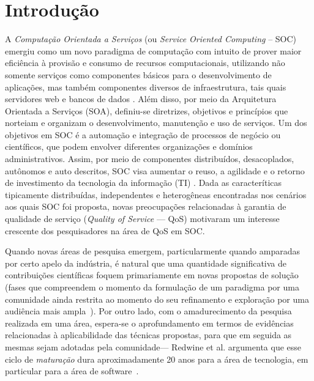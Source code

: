 
\section{Introdu\c{c}\~{a}o}\label{sec:introduction}

A \emph{Computa\c c\~{a}o Orientada a Servi\c cos} (ou \emph{Service Oriented Computing} -- SOC) emergiu como um novo paradigma de computa\c c\~{a}o com intuito de prover maior eficiência à provisão e consumo de recursos computacionais, utilizando não somente servi\c cos como componentes b\'{a}sicos para o desenvolvimento de aplica\c c\~{o}es, mas também componentes diversos de infraestrutura, tais quais servidores web e bancos de dados \cite{papazoglou:cacm2003} \cite{10.1109/MIC.2010.147}. Além disso, por meio da Arquitetura Orientada a Serviços (SOA), definiu-se diretrizes, objetivos e princípios que norteiam e organizam o desenvolvimento, manuten\c{c}\~{a}o e uso de serviços. Um dos objetivos em SOC \'{e} a automa\c c\~{a}o e integra\c c\~{a}o de processos de neg\'{o}cio ou cient\'{i}ficos, que podem envolver diferentes organiza\c c\~{o}es e domínios administrativos. Assim, por meio de componentes distribuídos, desacoplados, autônomos e auto descritos, SOC visa aumentar o reuso, a agilidade e o retorno de investimento da tecnologia da informação (TI) \cite{Erl:2007:SPS:1296147}. Dada as caracter\'{i}ticas tipicamente distribu\'{i}das, independentes e heterog\^{e}neas encontradas nos cen\'{a}rios aos quais SOC foi proposta, novas preocupa\c c\~{o}es relacionadas \`{a} garantia de qualidade de servi\c co (\emph{Quality of Service} --- QoS) motivaram um interesse crescente dos pesquisadores na \'{a}rea de QoS em SOC.







Quando novas \'{a}reas de pesquisa emergem, particularmente quando amparadas por certo apelo da ind\'{u}stria, \'{e} natural que uma quantidade significativa de contribui\c c\~{o}es cient\'{i}ficas foquem primariamente em novas propostas de solu\c c\~{a}o (fases que compreendem o momento da formula\c c\~{a}o de um paradigma por uma comunidade ainda restrita ao momento do seu refinamento e explora\c c\~{a}o por uma audi\^{e}ncia mais ampla~\cite{redwine:icse1985}). Por outro lado, com o amadurecimento da pesquisa realizada em uma \'{a}rea, espera-se o aprofundamento em termos de evid\^{e}ncias relacionadas \`{a} aplicabilidade das t\'{e}cnicas propostas, para que em seguida as mesmas sejam adotadas pela comunidade--- Redwine et al. argumenta que esse ciclo de \emph{matura\c c\~{a}o} dura aproximadamente 20 anos para a \'{a}rea de tecnologia, em particular para a \'{a}rea de software~\cite{redwine:icse1985}.

